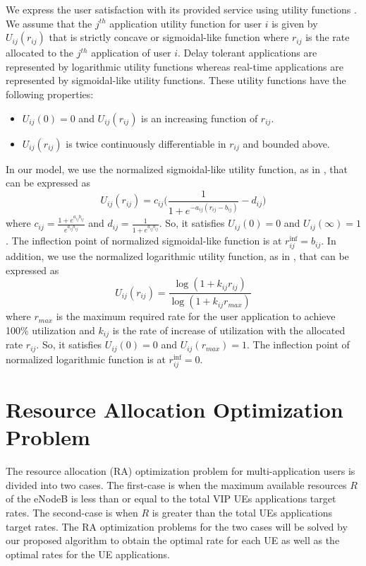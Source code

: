 \documentclass[journal]{IEEEtran} 				\IEEEoverridecommandlockouts 						\usepackage{amsmath,amssymb}
\begin{document}
We express the user satisfaction with its provided service using utility functions \cite{DL_PowerAllocation} \cite{Fundamental} \cite{Utility-proportional}. We assume that the $j^{th}$ application utility function for user $i$ is given by $U_{ij} (r_{ij})$ that is strictly concave or sigmoidal-like function where $r_{ij}$ is the rate allocated to the $j^{th}$ application of user $i$. Delay tolerant applications are represented by logarithmic utility functions whereas real-time applications are represented by sigmoidal-like utility functions. These utility functions have the following properties:
\begin{itemize}
\item $U_{ij}(0) = 0$ and $U_{ij}(r_{ij})$ is an increasing function of $r_{ij}$.
\item $U_{ij}(r_{ij})$ is twice continuously differentiable in $r_{ij}$ and bounded above.
\end{itemize}
In our model, we use the normalized sigmoidal-like utility function, as in \cite{DL_PowerAllocation}, that can be expressed as
\begin{equation}\label{eqn:sigmoid}
U_{ij}(r_{ij}) = c_{ij}\Big(\frac{1}{1+e^{-a_{ij}(r_{ij}-b_{ij})}}-d_{ij}\Big)
\end{equation}
where $c_{ij} = \frac{1+e^{a_{ij}b_{ij}}}{e^{a_{ij}b_{ij}}}$ and $d_{ij} = \frac{1}{1+e^{a_{ij}b_{ij}}}$. So, it satisfies $U_{ij}(0)=0$ and $U_{ij}(\infty)=1$. The inflection point of normalized sigmoidal-like function is at $r_{ij}^{\text{inf}}=b_{ij}$.
In addition, we use the normalized logarithmic utility function, as in \cite{Ahmed_Utility1}, that can be expressed as
\begin{equation}\label{eqn:log}
U_{ij}(r_{ij}) = \frac{\log(1+k_{ij}r_{ij})}{\log(1+k_{ij}r_{max})}
\end{equation}
where $r_{max}$ is the maximum required rate for the user application to achieve 100\% utilization and $k_{ij}$ is the rate of increase of utilization with the allocated rate $r_{ij}$. So, it satisfies $U_{ij}(0)=0$ and $U_{ij}(r_{max})=1$. The inflection point of normalized logarithmic function is at $r_{ij}^{\text{inf}}=0$.
\section{Resource Allocation Optimization Problem}\label{sec:ResourceAllocation}
The resource allocation (RA) optimization problem for multi-application users is divided into two cases. The first-case is when the maximum available resources $R$ of the eNodeB is less than or equal to the total VIP UEs applications target rates. The second-case is when $R$ is greater than the total UEs applications target rates. The RA optimization problems for the two cases will be solved by our proposed algorithm to obtain the optimal rate for each UE as well as the optimal rates for the UE applications.
\end{document}
